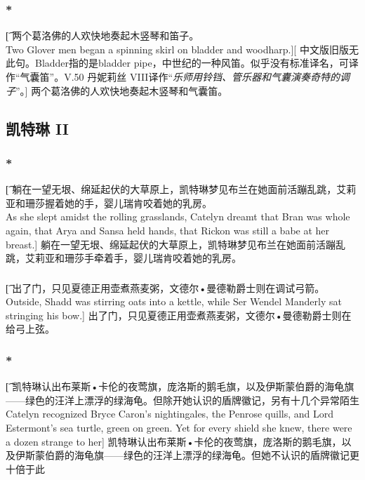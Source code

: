 \documentclass[12pt,a4paper]{article}
\begin{document}
\subsubsection{\color{red}*}\label{2.21.2}\t[
	两个葛洛佛的人欢快地奏起木竖琴和笛子。\\
	Two Glover men began a spinning skirl on bladder and woodharp.][
	中文版旧版无此句。Bladder指的是bladder pipe，中世纪的一种风笛。似乎没有标准译名，可译作“气囊笛”。V.50 丹妮莉丝 VIII译作“\emph{乐师用铃铛、管乐器和气囊演奏奇特的调子}”。]
	两个葛洛佛的人欢快地奏起木竖琴和气囊笛。
	
\subsection{凯特琳 II}
\subsubsection{\color{red}*}\t[
	躺在一望无垠、绵延起伏的大草原上，凯特琳梦见布兰在她面前活蹦乱跳，艾莉亚和珊莎握着她的手，婴儿瑞肯咬着她的乳房。\\
	As she slept amidst the rolling grasslands, Catelyn dreamt that Bran was whole again, that Arya and Sansa held hands, that Rickon was still a babe at her breast.]
	躺在一望无垠、绵延起伏的大草原上，凯特琳梦见布兰在她面前活蹦乱跳，艾莉亚和珊莎手牵着手，婴儿瑞肯咬着她的乳房。
	
\subsubsection{}\t[
	出了门，只见夏德正用壶煮燕麦粥，文德尔•曼德勒爵士则在调试弓箭。\\
	Outside, Shadd was stirring oats into a kettle, while Ser Wendel Manderly sat stringing his bow.]
	出了门，只见夏德正用壶煮燕麦粥，文德尔•曼德勒爵士则在给弓上弦。
	
\subsubsection{\color{red}*}\t[
	凯特琳认出布莱斯•卡伦的夜莺旗，庞洛斯的鹅毛旗，以及伊斯蒙伯爵的海龟旗——绿色的汪洋上漂浮的绿海龟。但除开她认识的盾牌徽记，另有十几个异常陌生\\
	Catelyn recognized Bryce Caron's nightingales, the Penrose quills, and Lord Estermont's sea turtle, green on green. Yet for every shield she knew, there were a dozen strange to her]
	凯特琳认出布莱斯•卡伦的夜莺旗，庞洛斯的鹅毛旗，以及伊斯蒙伯爵的海龟旗——绿色的汪洋上漂浮的绿海龟。但她不认识的盾牌徽记更十倍于此
\end{document}
